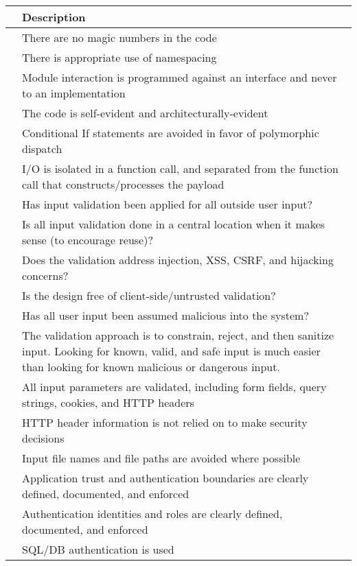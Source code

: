 \documentclass{article}
\begin{document}
\begin{center}
    \begin{tabular}{ | p{.25cm} || p{10cm} |}
    \hline
     & Description \\ \hline
     & There are no magic numbers in the code \\ \hline
     & There is appropriate use of namespacing \\ \hline
     & Module interaction is programmed against an interface and never to an implementation \\ \hline
     & The code is self-evident and architecturally-evident \\ \hline
     & Conditional If statements are avoided in favor of polymorphic dispatch \\ \hline
     & I/O is isolated in a function call, and separated from the function call that constructs/processes the payload \\ \hline
     & Has input validation been applied for all outside user input? \\ \hline
     & Is all input validation done in a central location when it makes sense (to encourage reuse)? \\ \hline
     & Does the validation address injection, XSS, CSRF, and hijacking concerns? \\ \hline
     & Is the design free of client-side/untrusted validation? \\ \hline
     & Has all user input been assumed malicious into the system? \\ \hline
     & The validation approach is to constrain, reject, and then sanitize input. Looking for known, valid, and safe input is much easier than looking for known malicious or dangerous input.\\ \hline
     & All input parameters are validated, including form fields, query strings, cookies, and HTTP headers \\ \hline
     & HTTP header information is not relied on to make security decisions \\ \hline
     & Input file names and file paths are avoided where possible \\ \hline
     & Application trust and authentication boundaries are clearly defined, documented, and enforced \\ \hline
     & Authentication identities and roles are clearly defined, documented, and enforced \\ \hline
     & SQL/DB authentication is used \\ \hline

\end{tabular}
\end{center}
\end{document}
